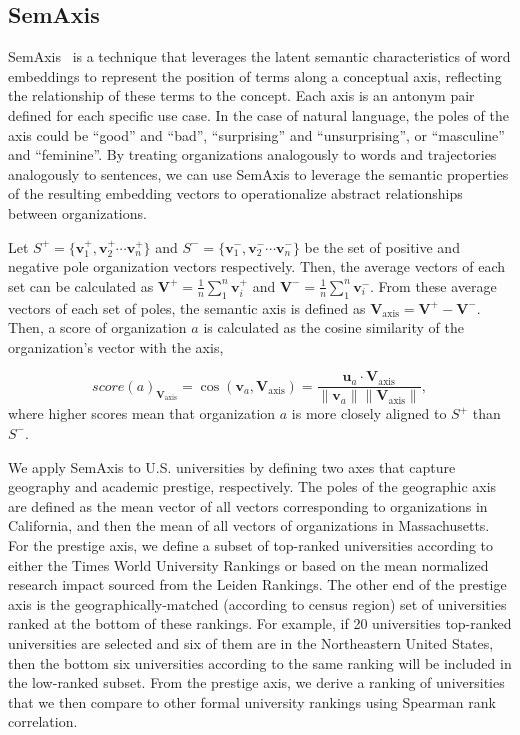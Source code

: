 \documentclass[12pt]{article} %
\begin{document}
%
%
\subsection*{SemAxis}
SemAxis~\autocite{an2018semaxis, nakandala2017gendered, kozlowski2018geometry} is a technique that leverages the latent semantic characteristics of word embeddings to represent the position of terms along a conceptual axis, reflecting the relationship of these terms to the concept.
Each axis is an antonym pair defined for each specific use case.
In the case of natural language, the poles of the axis could be ``good'' and ``bad'', ``surprising'' and ``unsurprising'', or ``masculine'' and ``feminine''.
By treating organizations analogously to words and trajectories analogously to sentences, we can use SemAxis to leverage the semantic properties of the resulting embedding vectors to operationalize abstract relationships between organizations.

Let $S^+ = \{\bm{v}_1^+, \bm{v}_2^+ \cdots \bm{v}_n^+\}$ and $S^- =\{\bm{v}_1^-, \bm{v}_2^- \cdots \bm{v}_n^-\}$ be the set of positive and negative pole organization vectors respectively. Then, the average vectors of each set can be calculated as $\bm{V}^{+} = \frac{1}{n}\sum^n_1 \bm{v}_i^+$ and $\bm{V}^{-} = \frac{1}{n}\sum^n_1 \bm{v}_i^-$. From these average vectors of each set of poles, the semantic axis is defined as $\bm{V}_{\text{axis}} = \bm{V}^{+} - \bm{V}^{-}$. Then,  a score of organization $a$ is calculated as the cosine similarity of the organization's vector with the axis,

$$
score(a)_{\bm{V}_{\text{axis}}} = \cos(\bm{v}_{a}, \bm{V}_{\text{axis}}) = \frac{\bm{u}_{a} \cdot \bm{V}_{\text{axis}}}{\lVert \bm{v}_{a} \rVert \lVert \bm{V}_{\text{axis}} \rVert},
$$
where higher scores mean that organization $a$ is more closely aligned to $S^+$ than $S^-$.

We apply SemAxis to U.S. universities by defining two axes that capture geography and academic prestige, respectively.
The poles of the geographic axis are defined as the mean vector of all vectors corresponding to organizations in California, and then the mean of all vectors of organizations in Massachusetts.
For the prestige axis, we define a subset of top-ranked universities according to either the Times World University Rankings or based on the mean normalized research impact sourced from the Leiden Rankings.
The other end of the prestige axis is the geographically-matched (according to census region) set of universities ranked at the bottom of these rankings.
For example, if 20 universities top-ranked universities are selected and six of them are in the Northeastern United States, then the bottom six universities according to the same ranking will be included in the low-ranked subset.
From the prestige axis, we derive a ranking of universities that we then compare to other formal university rankings using Spearman rank correlation.
\end{document}
